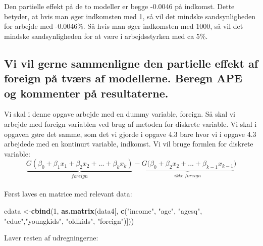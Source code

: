 \documentclass[
  10pt,
]{article}
\newenvironment{Shaded}{\begin{snugshade}}{\end{snugshade}}
\newcommand{\CommentTok}[1]{\textcolor[rgb]{0.56,0.35,0.01}{\textit{#1}}}
\newcommand{\DecValTok}[1]{\textcolor[rgb]{0.00,0.00,0.81}{#1}}
\newcommand{\KeywordTok}[1]{\textcolor[rgb]{0.13,0.29,0.53}{\textbf{#1}}}
\newcommand{\NormalTok}[1]{#1}
\newcommand{\OperatorTok}[1]{\textcolor[rgb]{0.81,0.36,0.00}{\textbf{#1}}}
\newcommand{\StringTok}[1]{\textcolor[rgb]{0.31,0.60,0.02}{#1}}
\begin{document}
Den partielle effekt på de to modeller er begge -0.0046 på indkomst.
Dette betyder, at hvis man øger indkomsten med 1, så vil det mindske
sandsynligheden for arbejde med -0.0046\%. Så hvis man øger indkomsten
med 1000, så vil det mindske sandsynligheden for at være i
arbejdsstyrken med ca 5\%.

\hypertarget{vi-vil-gerne-sammenligne-den-partielle-effekt-af-foreign-puxe5-tvuxe6rs-af-modellerne.-beregn-ape-og-kommenter-puxe5-resultaterne.}{%
\subsection{Vi vil gerne sammenligne den partielle effekt af foreign på
tværs af modellerne. Beregn APE og kommenter på
resultaterne.}\label{vi-vil-gerne-sammenligne-den-partielle-effekt-af-foreign-puxe5-tvuxe6rs-af-modellerne.-beregn-ape-og-kommenter-puxe5-resultaterne.}}

Vi skal i denne opgave arbejde med en dummy variable, foreign. Så skal
vi arbejde med foreign variablen ved brug af metoden for diskrete
variable. Vi skal i opgaven gøre det samme, som det vi gjorde i opgave
4.3 bare hvor vi i opgave 4.3 arbejdede med en kontinurt variable,
indkomst. Vi vil bruge formlen for diskrete variable:
\[ \underbrace{G(\beta_0+\beta_1x_1+\beta_2x_2+...+\beta_kx_k)}_{foreign}-\underbrace{G(\beta_0+\beta_2x_2+...+\beta_{k-1}x_{k-1}}_{ikke\ foreign}) \]\\
Først laves en matrice med relevant data:

\begin{Shaded}
\begin{Highlighting}[]
\NormalTok{cdata <-}\KeywordTok{cbind}\NormalTok{(}\DecValTok{1}\NormalTok{, }\KeywordTok{as.matrix}\NormalTok{(data4[, }\KeywordTok{c}\NormalTok{(}\StringTok{"income"}\NormalTok{, }\StringTok{"age"}\NormalTok{, }\StringTok{"agesq"}\NormalTok{, }\StringTok{"educ"}\NormalTok{,}\StringTok{"youngkids"}\NormalTok{, }
                                     \StringTok{"oldkids"}\NormalTok{, }\StringTok{"foreign"}\NormalTok{)]))}
\end{Highlighting}
\end{Shaded}

Laver resten af udregningerne:

\begin{Shaded}
\end{Shaded}
\end{document}
